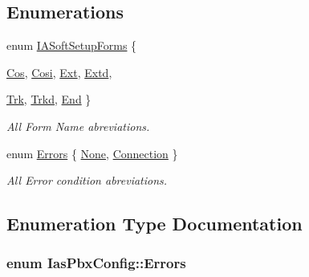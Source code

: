 \subsection*{Enumerations}
\begin{DoxyCompactItemize}
\item 
enum \hyperlink{namespace_ias_pbx_config_a3304277b6c0e85a58951234034da7f3b}{IASoftSetupForms} \{ \par
\hyperlink{namespace_ias_pbx_config_a3304277b6c0e85a58951234034da7f3b}{Cos}, 
\hyperlink{namespace_ias_pbx_config_a3304277b6c0e85a58951234034da7f3b}{Cosi}, 
\hyperlink{namespace_ias_pbx_config_a3304277b6c0e85a58951234034da7f3b}{Ext}, 
\hyperlink{namespace_ias_pbx_config_a3304277b6c0e85a58951234034da7f3b}{Extd}, 
\par
\hyperlink{namespace_ias_pbx_config_a3304277b6c0e85a58951234034da7f3b}{Trk}, 
\hyperlink{namespace_ias_pbx_config_a3304277b6c0e85a58951234034da7f3b}{Trkd}, 
\hyperlink{namespace_ias_pbx_config_a3304277b6c0e85a58951234034da7f3b}{End}
 \}
\begin{DoxyCompactList}\small\item\em All Form Name abreviations. \item\end{DoxyCompactList}\item 
enum \hyperlink{namespace_ias_pbx_config_afbeaf23ebc85892dc4c2cb09f7f2a0cb}{Errors} \{ \hyperlink{namespace_ias_pbx_config_afbeaf23ebc85892dc4c2cb09f7f2a0cb}{None}, 
\hyperlink{namespace_ias_pbx_config_afbeaf23ebc85892dc4c2cb09f7f2a0cb}{Connection}
 \}
\begin{DoxyCompactList}\small\item\em All Error condition abreviations. \item\end{DoxyCompactList}\end{DoxyCompactItemize}


\subsection{Enumeration Type Documentation}
\hypertarget{namespace_ias_pbx_config_afbeaf23ebc85892dc4c2cb09f7f2a0cb}{
\subsubsection[{Errors}]{\setlength{\rightskip}{0pt plus 5cm}enum {\bf IasPbxConfig::Errors}}}
\label{namespace_ias_pbx_config_afbeaf23ebc85892dc4c2cb09f7f2a0cb}


